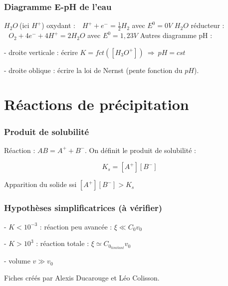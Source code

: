 \documentclass[9pt,twocolumn]{article}
\begin{document}
\section{Diagramme E-pH de l'eau}

$H_2O \>$(ici $H^+$) oxydant : $\>\>\> H^+ + e^-= \frac{1}{2}H_2$ avec $E^0=0V$
\smallbreak
$H_2O$ réducteur : $\>\>\> O_2+4e^-+4H^+=2H_2O$ avec $E^0=1,23V$
\medbreak
Autres diagramme pH :

 - droite verticale : écrire $K=fct([H_3O^+]) \>\Rightarrow\>pH=cst$
 
 - droite oblique : écrire la loi de Nernst (pente fonction du $pH$).
 
 
\part*{Réactions de précipitation}
\section{Produit de solubilité}

Réaction : $ AB = A^+ + B^-$. On définit le produit de solubilité :

$$\boxed{K_s=[A^+][B^-]}$$

\medbreak
Apparition du solide ssi $[A^+][B^-]>K_s$

\section{Hypothèses simplificatrices (à vérifier)}
- $K < 10^{-3}$ : réaction peu avancée : $\xi\ll C_0 v_0$

- $K > 10^{3}$ : réaction totale : $\xi\simeq C_{0_{limitant}} v_0$

- volume $v\gg v_0$

\vfill
\footnotesize{Fiches créés par Alexis Ducarouge et Léo Colisson.}
\end{document}
